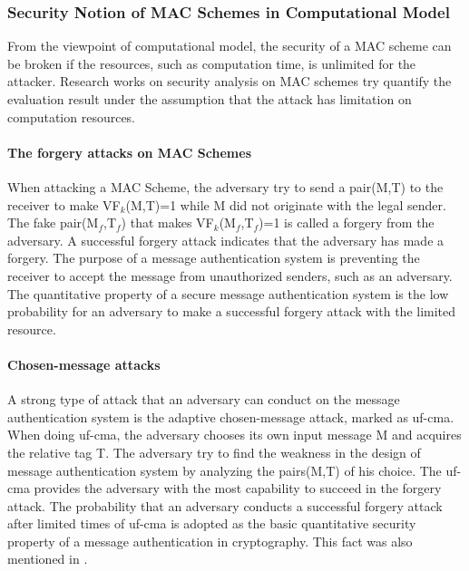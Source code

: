 \documentclass{article}
\begin{document}
\subsubsection{Security Notion of MAC Schemes in Computational Model}
From the viewpoint of computational model, the security of a MAC scheme can be
broken if the resources, such as computation time, is unlimited for the
attacker. Research works on
security analysis on MAC schemes try quantify the evaluation result under the assumption that the attack has limitation on computation resources.
\paragraph{The forgery attacks on MAC Schemes}
When attacking a MAC Scheme, the adversary try to send a pair(M,T) to the receiver to make VF$_k$(M,T)=1 while M did not originate with the legal sender. The fake pair(M$_f$,T$_f$) that makes VF$_k$(M$_f$,T$_f$)=1 is called a forgery from the adversary. A successful forgery attack indicates that the adversary has made a forgery. 
The purpose of a message authentication system is preventing the receiver to accept the message from unauthorized senders, such as an adversary. The quantitative property of a secure message authentication system is the low probability for an adversary to make a successful forgery attack with the limited resource.
\paragraph{Chosen-message attacks}
A strong type of attack that an adversary can conduct on the message authentication system is the adaptive chosen-message attack, marked as uf-cma. When doing uf-cma, the adversary chooses its own input message M and acquires the relative tag T. The adversary try to find the weakness in the design of message authentication system by analyzing the pairs(M,T) of his choice. The uf-cma provides the adversary with the most capability to succeed in the forgery attack. The probability that an adversary conducts a successful forgery attack after limited times of uf-cma is adopted as the basic quantitative security property of a message authentication in cryptography. This fact was also mentioned in \cite{Rogaway2011}.
\end{document}
